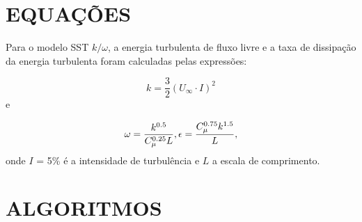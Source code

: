 \begin{apendicesenv}
\begin{figure}[!htb]
{        }\hspace{2ex}
    \end{figure}

    \section{EQUAÇÕES}
    \label{equacoes}

   Para o modelo SST $k/\omega$, a energia turbulenta de fluxo livre e a taxa de dissipação da energia turbulenta foram calculadas pelas expressões:

    \begin{equation}
    k = \frac{3}{2} (U_\infty \cdot I)^{2}
    \label{eq41}
    \end{equation}
    e

    \begin{equation}
    \omega = \frac{k^{0.5}}{C_{\mu}^{0.25} L}, \\
    \epsilon =\frac{C_{\mu}^{0.75}k^{1.5}}{L},
    \label{eq42}
    \end{equation}
    onde $I$ = 5\% é a intensidade de turbulência e $L$ a escala de comprimento.

    \section{ALGORITMOS}
    \label{algoritmos}


\end{apendicesenv}

